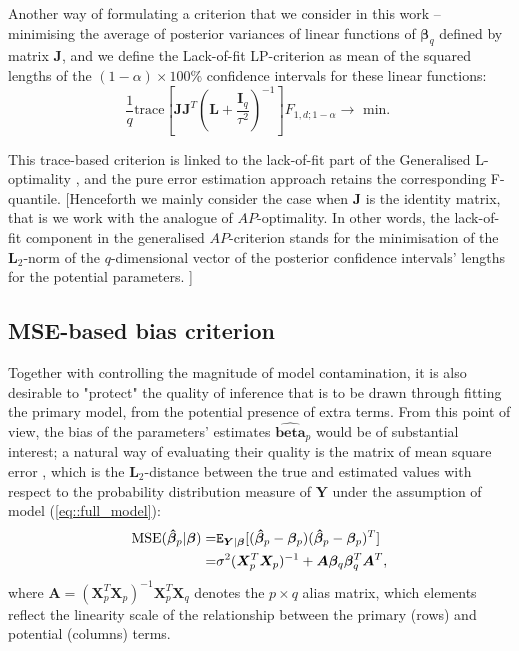 Another way of formulating a criterion that we consider in this work -- minimising the average of posterior variances of linear functions of $\bm{\beta}_q$ defined by matrix $\bm{J}$, and we define the Lack-of-fit LP-criterion as mean of the squared lengths of the $(1-\alpha)\times100\%$ confidence intervals for these linear functions:
\begin{equation}
\label{eq::LoFLP_criterion}
\frac{1}{q}\mbox{trace}\left[\bm{JJ}^T\left(\bm{L}+\frac{\bm{I}_{q}}{\tau^{2}}\right)^{-1}\right]F_{1,d;1-\alpha}  \longrightarrow \mbox{ min. } 
\end{equation} 

This trace-based criterion is linked to the lack-of-fit part of the Generalised L-optimality \citep{Goos2005model}, and the pure error estimation approach retains the corresponding F-quantile. 
[Henceforth we mainly consider the case when $\bm{J}$ is the identity matrix, that is we work with the analogue of $AP$-optimality. In other words, the lack-of-fit component in the generalised $AP$-criterion  stands for the minimisation of the $\bm{L}_2$-norm of the $q$-dimensional vector of the posterior confidence intervals' lengths for the potential parameters. ]

\subsection*{MSE-based bias criterion}
Together with controlling the magnitude of model contamination, it is also desirable to "protect" the quality of inference that is to be drawn through fitting the primary model, from the potential presence of extra terms. 
From this point of view, the bias of the parameters' estimates $\hat{\bm{beta}}_p$ would be of substantial interest; a natural way of evaluating their quality is the matrix of  mean square error \citep{FedorovMontepiedra1997} , which is the $\bm{L}_2$-distance between the true and estimated values with respect to the probability distribution measure of $\bm{Y}$ under the assumption of model (\ref{eq::full_model}):
\begin{align}
\label{eq::MSE}
\mbox{MSE}(\bm{\hat{\beta}}_p|\bm{\beta})=&\mathtt{E}_{\bm{Y}|\bm{\beta}}[(\bm{\hat{\beta}}_p-\bm{\beta}_p)(\bm{\hat{\beta}}_p-\bm{\beta}_p)^T]\notag\\=&\sigma^2(\bm{X}_p^T\bm{X}_p)^{-1}+\bm{A}\bm{\beta}_q\bm{\beta}_q^T\bm{A}^T, 
\end{align}
where $\bm{A}=(\bm{X}_p^{T}\bm{X}_p)^{-1}\bm{X}_p^{T}\bm{X}_q$ denotes the $p \times q$ alias matrix, which elements reflect the linearity scale of the relationship between the primary (rows) and potential (columns) terms. 

